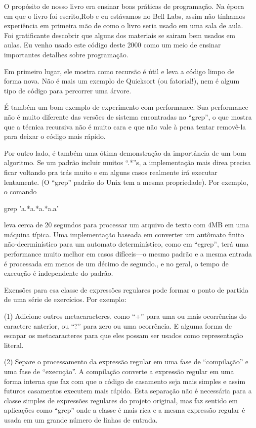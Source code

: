 O propósito de nosso livro era ensinar boas práticas de
programação. Na época em que o livro foi escrito,Rob e eu estávamos no
Bell Labs, assim não tínhamos experiência em primeira mão de como o
livro seria usado em uma sala de aula. Foi gratificante descobrir que
alguns dos materiais se sairam bem usados em aulas. Eu venho usado
este código deste 2000 como um meio de ensinar importantes detalhes
sobre programação.

Em primeiro lugar, ele mostra como recursão é útil e leva a código
limpo de forma nova. Não é mais um exemplo de Quicksort (ou
fatorial!), nem é algum tipo de código para percorrer uma árvore.

É também um bom exemplo de experimento com performance. Sua
performance não é muito diferente das versões de sistema encontradas
no ``grep'', o que mostra que a técnica recursiva não é muito cara e
que não vale à pena tentar removê-la para deixar o código mais rápido.

Por outro lado, é também uma ótima demonstração da importância de um
bom algoritmo. Se um padrão incluir muitos ``.*''s, a implementação
mais direa precisa ficar voltando pra trás muito e em alguns casos
realmente irá executar lentamente. (O ``grep'' padrão do Unix tem a
mesma propriedade). Por exemplo, o comando

\alinhaverbatim
grep 'a.*a.*a.*a.a' 
\alinhanormal

leva cerca de 20 segundos para processar um arquivo de texto com 4MB
em uma máquina típica. Uma implementação baseada em converter um
autômato finito não-deerminístico para um automato determinístico,
como em ``egrep'', terá uma performance muito melhor em casos
difíceis---o mesmo padrão e a mesma entrada é processada em menos de
um décimo de segundo., e no geral, o tempo de execução é independente
do padrão.

Exensões para esa classe de expressões regulares pode formar o ponto
de partida de uma série de exercícios. Por exemplo:

(1) Adicione outros metacaracteres, como ``+'' para uma ou mais
ocorrências do caractere anterior, ou ``?'' para zero ou uma
ocorrência. E alguma forma de escapar os metacaracteres para que eles
possam ser usados como representação literal.

(2) Separe o processamento da expressão regular em uma fase de
``compilação'' e uma fase de ``execução''. A compilação converte a
expressão regular em uma forma interna que faz com que o código de
casamento seja mais simples e assim futuros casamentos executem mais
rápido. Esta separação não é necessária para a classe simples de
expressões regulares do projeto original, mas faz sentido em
aplicações como ``grep'' onde a classe é mais rica e a mesma expressão
regular é usada em um grande número de linhas de entrada.

